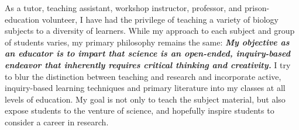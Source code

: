 As a tutor, teaching assistant, workshop
instructor, professor, and prison-education volunteer,
I have had the privilege of teaching a variety of biology subjects to a
diversity of learners.
While my approach to each subject and group of students varies, my primary
philosophy remains the same:
\textbf{\textit{My objective as an educator is to impart that
        science
        is an open-ended, inquiry-based endeavor that inherently requires
        critical thinking and creativity.}}
I try to blur the distinction between teaching and research and incorporate
active, inquiry-based learning techniques and primary literature into my
classes at all levels of
education.
My goal is not only to teach the subject material, but also expose students to
the venture of science, and hopefully inspire students to consider a
career in research.


